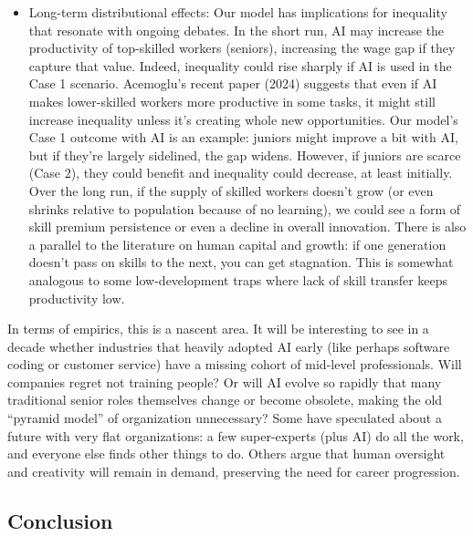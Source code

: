 \documentclass[12pt]{article}
\begin{document}
\begin{itemize}
\begin{itemize}
{    jobs} -- e.g., funding for R\&D in areas where humans can expand
    work with AI rather than be replaced.
  \end{itemize}
\item
  {Long-term distributional effects:} Our model has implications
  for inequality that resonate with ongoing debates. In the short run,
  AI may increase the productivity of top-skilled workers (seniors),
  increasing the wage gap if they capture that value. Indeed,
  {inequality could rise sharply} if AI is used in the Case 1
  scenario. Acemoglu's recent paper (2024) suggests that even if AI
  makes lower-skilled workers more productive in some tasks, it might
  {still} increase inequality unless it's creating whole new
  opportunities. Our model's Case 1 outcome with AI is an example:
  juniors might improve a bit with AI, but if they're largely sidelined,
  the gap widens. However, if juniors are scarce (Case 2), they could
  benefit and inequality could decrease, at least initially. Over the
  long run, if the supply of skilled workers doesn't grow (or even
  shrinks relative to population because of no learning), we could see a
  form of {skill premium persistence} or even a decline in
  overall innovation. There is also a parallel to the literature on
  {human capital and growth}: if one generation doesn't pass on
  skills to the next, you can get stagnation. This is somewhat analogous
  to some low-development traps where lack of skill transfer keeps
  productivity low.
\end{itemize}

In terms of {empirics}, this is a nascent area. It will be
interesting to see in a decade whether industries that heavily adopted
AI early (like perhaps software coding or customer service) have a
missing cohort of mid-level professionals. Will companies regret not
training people? Or will AI evolve so rapidly that many traditional
senior roles themselves change or become obsolete, making the old
``pyramid model'' of organization unnecessary? Some have speculated
about a future with {very flat organizations}: a few
super-experts (plus AI) do all the work, and everyone else finds other
things to do. Others argue that human oversight and creativity will
remain in demand, preserving the need for career progression.

\subsection{Conclusion}\label{conclusion}
\end{document}
